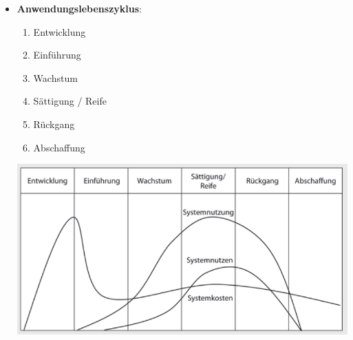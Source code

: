 \documentclass[12pt,a4paper]{article}
\begin{document}
\begin{itemize}
   \item \textbf{Anwendungslebenszyklus}:\\
      \begin{minipage}[t]{0.3\textwidth}\vspace*{0cm}
         \begin{enumerate}
				\item Entwicklung
				\item Einführung
				\item Wachstum
				\item Sättigung / Reife
				\item Rückgang
				\item Abschaffung
         \end{enumerate}
      \end{minipage}
      \begin{minipage}[t]{0.3\textwidth}\vspace*{0cm}
         \includegraphics[scale=0.5]{Anwendungsleben.png}
      \end{minipage}
      
      
      
\end{itemize}


\vspace{0.5cm}
\end{document}

